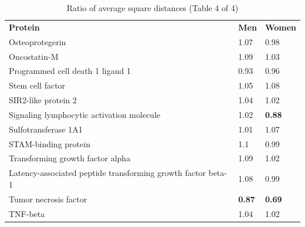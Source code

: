 \begin{table}[ht]
\caption{Ratio of average square distances (Table 4 of 4)}
\centering
\renewcommand{\arraystretch}{1.2}
\begin{tabular}{lll}
\rowcolor[HTML]{FFFFC7} 
\textbf{Protein}                                             & \textbf{Men}                         & \textbf{Women}                       \\
Osteoprotegerin                                              & {\color[HTML]{C0C0C0} 1.07}          & {\color[HTML]{C0C0C0} 0.98}          \\
Oncostatin-M                                                 & {\color[HTML]{C0C0C0} 1.09}          & {\color[HTML]{C0C0C0} 1.03}          \\
Programmed cell death 1 ligand 1                             & {\color[HTML]{C0C0C0} 0.93}          & {\color[HTML]{C0C0C0} 0.96}          \\
Stem cell factor                                             & {\color[HTML]{C0C0C0} 1.05}          & {\color[HTML]{C0C0C0} 1.08}          \\
\rowcolor[HTML]{EFEFEF} 
SIR2-like protein 2                                          & {\color[HTML]{C0C0C0} 1.04}          & {\color[HTML]{C0C0C0} 1.02}          \\
\rowcolor[HTML]{EFEFEF} 
Signaling lymphocytic activation molecule                    & {\color[HTML]{C0C0C0} 1.02}          & {\color[HTML]{CB0000} \textbf{0.88}} \\
\rowcolor[HTML]{EFEFEF} 
Sulfotransferase 1A1                                         & {\color[HTML]{C0C0C0} 1.01}          & {\color[HTML]{C0C0C0} 1.07}          \\
\rowcolor[HTML]{EFEFEF} 
STAM-binding protein                                         & {\color[HTML]{C0C0C0} 1.1}           & {\color[HTML]{C0C0C0} 0.99}          \\
Transforming growth factor alpha                             & {\color[HTML]{C0C0C0} 1.09}          & {\color[HTML]{C0C0C0} 1.02}          \\
Latency-associated peptide transforming growth factor beta-1 & {\color[HTML]{C0C0C0} 1.08}          & {\color[HTML]{C0C0C0} 0.99}          \\
Tumor necrosis factor                                        & {\color[HTML]{CB0000} \textbf{0.87}} & {\color[HTML]{CB0000} \textbf{0.69}} \\
TNF-beta                                                     & {\color[HTML]{C0C0C0} 1.04}          & {\color[HTML]{C0C0C0} 1.02}          \\

\end{tabular}
\end{table}
